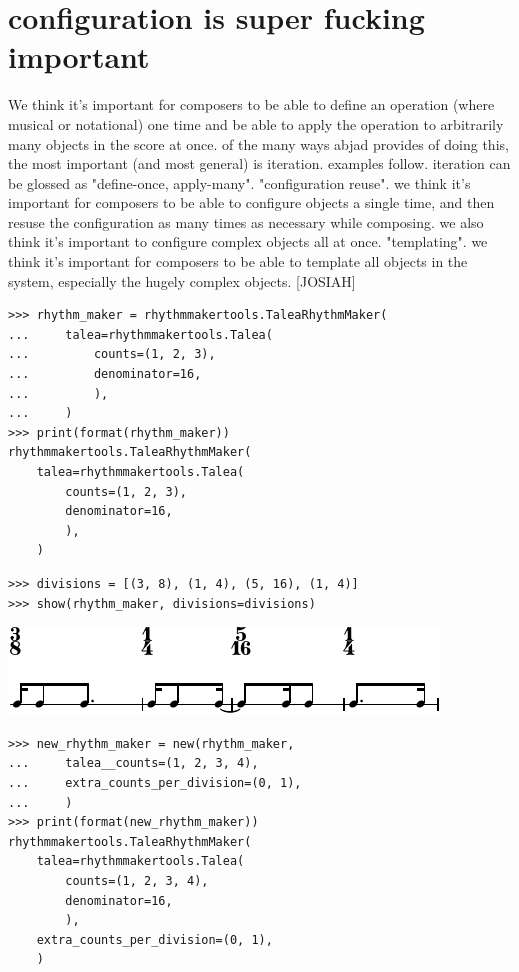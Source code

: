 \documentclass{article}
\begin{document}
\section{configuration is super fucking important}

We think it's important for composers to be able to define an operation (where
musical or notational) one time and be able to apply the operation to
arbitrarily many objects in the score at once. of the many ways abjad provides
of doing this, the most important (and most general) is iteration. examples
follow. iteration can be glossed as "define-once, apply-many". "configuration
reuse". we think it's important for composers to be able to configure objects a
single time, and then resuse the configuration as many times as necessary while
composing. we also think it's important to configure complex objects all at
once. "templating". we think it's important for composers to be able to
template all objects in the system, especially the hugely complex objects.
[JOSIAH]

\begin{lstlisting}
>>> rhythm_maker = rhythmmakertools.TaleaRhythmMaker(
...     talea=rhythmmakertools.Talea(
...         counts=(1, 2, 3),
...         denominator=16,
...         ),
...     )
>>> print(format(rhythm_maker))
rhythmmakertools.TaleaRhythmMaker(
    talea=rhythmmakertools.Talea(
        counts=(1, 2, 3),
        denominator=16,
        ),
    )
\end{lstlisting}


\begin{lstlisting}
>>> divisions = [(3, 8), (1, 4), (5, 16), (1, 4)]
>>> show(rhythm_maker, divisions=divisions)
\end{lstlisting}

\includegraphics[scale=1.0]{images/abjad-8.pdf}


\begin{lstlisting}
>>> new_rhythm_maker = new(rhythm_maker,
...     talea__counts=(1, 2, 3, 4),
...     extra_counts_per_division=(0, 1),
...     )
>>> print(format(new_rhythm_maker))
rhythmmakertools.TaleaRhythmMaker(
    talea=rhythmmakertools.Talea(
        counts=(1, 2, 3, 4),
        denominator=16,
        ),
    extra_counts_per_division=(0, 1),
    )
\end{lstlisting}
\end{document}
